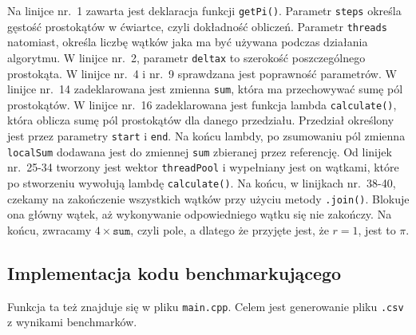 Na linijce nr.~1 zawarta jest deklaracja funkcji \texttt{getPi()}. Parametr \texttt{steps} określa gęstość prostokątów w ćwiartce, czyli dokładność obliczeń. Parametr \texttt{threads} natomiast, określa liczbę wątków jaka ma być używana podczas działania algorytmu. W linijce nr.~2, parametr \texttt{deltax} to szerokość poszczególnego prostokąta. W linijce nr.~4 i nr.~9 sprawdzana jest poprawność parametrów. W linijce nr.~14 zadeklarowana jest zmienna \texttt{sum}, która ma przechowywać sumę pól prostokątów. W linijce nr.~16 zadeklarowana jest funkcja lambda \texttt{calculate()}, która oblicza sumę pól prostokątów dla danego przedziału. Przedział określony jest przez parametry \texttt{start} i \texttt{end}. Na końcu lambdy, po zsumowaniu pól zmienna \texttt{localSum} dodawana jest do zmiennej \texttt{sum} zbieranej przez referencję. Od linijek nr.~25-34 tworzony jest wektor \texttt{threadPool} i wypełniany jest on wątkami, które po stworzeniu wywołują lambdę \texttt{calculate()}. Na końcu, w linijkach nr.~38-40, czekamy na zakończenie wszystkich wątków przy użyciu metody \texttt{.join()}. Blokuje ona główny wątek, aż wykonywanie odpowiedniego wątku się nie zakończy. Na końcu, zwracamy $4 \times \texttt{sum}$, czyli pole, a dlatego że przyjęte jest, że $r = 1$, jest to $\pi$.

\subsection{Implementacja kodu benchmarkującego}

Funkcja ta też znajduje się w pliku \texttt{main.cpp}. Celem jest generowanie pliku \texttt{.csv} z wynikami benchmarków.

